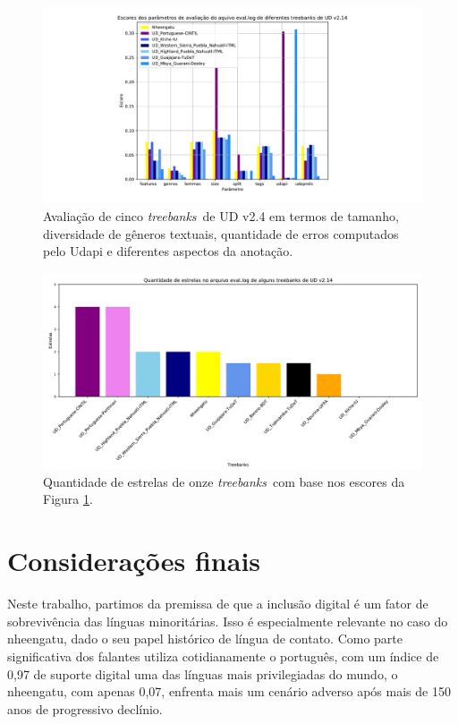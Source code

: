 \documentclass[portuguese]{textolivre}
\newcommand{\tbs}{\textit{treebanks}}
\begin{document}
\begin{figure}[htbp]
  \centering
  \begin{minipage}{.85\textwidth}
    \includegraphics[width=\linewidth]{figures/eval-log.pdf}
    \caption{Avaliação de cinco \tbs~de UD v2.4 em termos de tamanho, diversidade de gêneros textuais, quantidade de erros computados pelo Udapi e diferentes aspectos da anotação.}
    \label{fig:eval-scores}
  \end{minipage}
\end{figure}

\begin{figure}[htbp]
  \centering
  \begin{minipage}{.75\textwidth}
    \includegraphics[width=\linewidth]{figures/EvalStarsTBs.pdf}
    \caption{Quantidade de estrelas de onze \tbs~com base nos escores da Figura \ref{fig:eval-scores}.}
    \label{fig:eval-stars}
  \end{minipage}
\end{figure}

\section{Considerações finais}\label{sec:finais}
Neste trabalho, partimos da premissa de que a inclusão digital é um fator de sobrevivência das línguas minoritárias. Isso é especialmente relevante no caso do nheengatu, dado o seu papel histórico de língua de contato. Como parte significativa dos falantes utiliza cotidianamente o português, com um índice de 0,97 de suporte digital uma das línguas mais privilegiadas do mundo, o nheengatu, com apenas 0,07, enfrenta mais um cenário adverso após mais de 150 anos de progressivo declínio.
\end{document}
